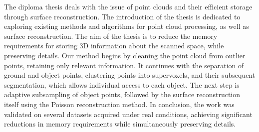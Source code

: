 The diploma thesis deals with the issue of point clouds and their efficient storage through surface reconstruction. The introduction of the thesis is dedicated to exploring existing methods and algorithms for point cloud processing, as well as surface reconstruction. The aim of the thesis is to reduce the memory requirements for storing 3D information about the scanned space, while preserving details. Our method begins by cleaning the point cloud from outlier points, retaining only relevant information. It continues with the separation of ground and object points, clustering points into supervoxels, and their subsequent segmentation, which allows individual access to each object. The next step is adaptive subsampling of object points, followed by the surface reconstruction itself using the Poisson reconstruction method. In conclusion, the work was validated on several datasets acquired under real conditions, achieving significant reductions in memory requirements while simultaneously preserving details.